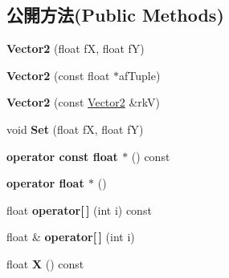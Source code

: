 \subsection*{公開方法(Public Methods)}
\begin{DoxyCompactItemize}
\item 
{\bfseries Vector2} (float fX, float fY)\hypertarget{class_magnum_1_1_vector2_a14c06cf3a823a0454502d70bb5e553a1}{}\label{class_magnum_1_1_vector2_a14c06cf3a823a0454502d70bb5e553a1}

\item 
{\bfseries Vector2} (const float $\ast$af\+Tuple)\hypertarget{class_magnum_1_1_vector2_ad31e5c9ec90c5ed7aad6004a94bc6902}{}\label{class_magnum_1_1_vector2_ad31e5c9ec90c5ed7aad6004a94bc6902}

\item 
{\bfseries Vector2} (const \hyperlink{class_magnum_1_1_vector2}{Vector2} \&rkV)\hypertarget{class_magnum_1_1_vector2_ad16cc1e2626fdc0114e81abcc72e1c2a}{}\label{class_magnum_1_1_vector2_ad16cc1e2626fdc0114e81abcc72e1c2a}

\item 
void {\bfseries Set} (float fX, float fY)\hypertarget{class_magnum_1_1_vector2_abad6abbfba23ead573c61f85ec7c88eb}{}\label{class_magnum_1_1_vector2_abad6abbfba23ead573c61f85ec7c88eb}

\item 
{\bfseries operator const float $\ast$} () const \hypertarget{class_magnum_1_1_vector2_a28c64b39f3dec69361853211ad5f7271}{}\label{class_magnum_1_1_vector2_a28c64b39f3dec69361853211ad5f7271}

\item 
{\bfseries operator float $\ast$} ()\hypertarget{class_magnum_1_1_vector2_a12847f43bae78ff7c3385702a1d0bfde}{}\label{class_magnum_1_1_vector2_a12847f43bae78ff7c3385702a1d0bfde}

\item 
float {\bfseries operator\mbox{[}$\,$\mbox{]}} (int i) const \hypertarget{class_magnum_1_1_vector2_a7c3fe298f38ee81f2bb3c92149d5f315}{}\label{class_magnum_1_1_vector2_a7c3fe298f38ee81f2bb3c92149d5f315}

\item 
float \& {\bfseries operator\mbox{[}$\,$\mbox{]}} (int i)\hypertarget{class_magnum_1_1_vector2_a4f25da8e6d15fb603d3e8d5e0b3866b9}{}\label{class_magnum_1_1_vector2_a4f25da8e6d15fb603d3e8d5e0b3866b9}

\item 
float {\bfseries X} () const \hypertarget{class_magnum_1_1_vector2_a96d5d8754b3b0e2b7ac6e91944675ec1}{}\label{class_magnum_1_1_vector2_a96d5d8754b3b0e2b7ac6e91944675ec1}


\end{DoxyCompactItemize}

